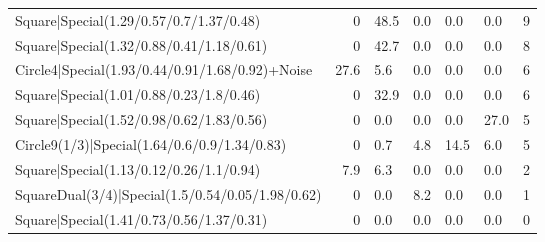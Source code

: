 \begin{tabular}{lrllllr}
 Square|Special(1.29/0.57/0.7/1.37/0.48)                       &             0   & 48.5           & 0.0             & 0.0             & 0.0             &            9 \\
 Square|Special(1.32/0.88/0.41/1.18/0.61)                      &             0   & 42.7           & 0.0             & 0.0             & 0.0             &            8 \\
 Circle4|Special(1.93/0.44/0.91/1.68/0.92)+Noise               &            27.6 & 5.6            & 0.0             & 0.0             & 0.0             &            6 \\
 Square|Special(1.01/0.88/0.23/1.8/0.46)                       &             0   & 32.9           & 0.0             & 0.0             & 0.0             &            6 \\
 Square|Special(1.52/0.98/0.62/1.83/0.56)                      &             0   & 0.0            & 0.0             & 0.0             & 27.0            &            5 \\
 Circle9(1/3)|Special(1.64/0.6/0.9/1.34/0.83)                  &             0   & 0.7            & 4.8             & 14.5            & 6.0             &            5 \\
 Square|Special(1.13/0.12/0.26/1.1/0.94)                       &             7.9 & 6.3            & 0.0             & 0.0             & 0.0             &            2 \\
 SquareDual(3/4)|Special(1.5/0.54/0.05/1.98/0.62)              &             0   & 0.0            & 8.2             & 0.0             & 0.0             &            1 \\
 Square|Special(1.41/0.73/0.56/1.37/0.31)                      &             0   & 0.0            & 0.0             & 0.0             & 0.0             &            0 \\
\hline
\end{tabular}